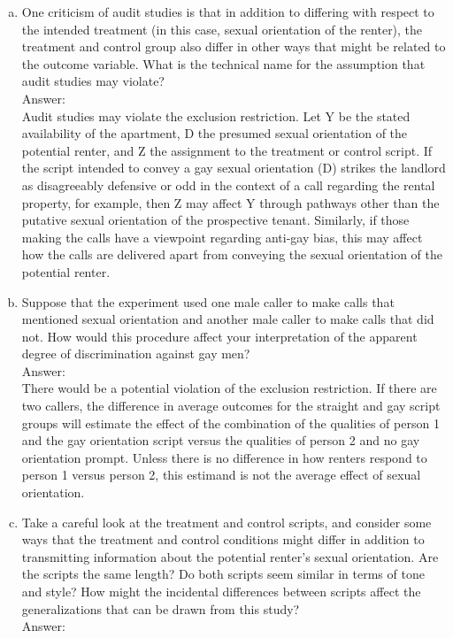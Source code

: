 \documentclass[11pt,notitlepage]{article}\usepackage[]{graphicx}\usepackage[]{color}
\begin{document}
\begin{enumerate}[a)]
\item One criticism of audit studies is that in addition to differing with respect to the intended treatment (in this case, sexual orientation of the renter), the treatment and control group also differ in other ways that might be related to the outcome variable. What is the technical name for the assumption that audit studies may violate?\\
Answer:\\
Audit studies may violate the exclusion restriction. Let Y be the stated availability of the apartment, D the presumed sexual orientation of the potential renter, and Z the assignment to the treatment or control script. If the script intended to convey a gay sexual orientation (D) strikes the landlord as disagreeably defensive or odd in the context of a call regarding the rental property, for example, then Z may affect Y through pathways other than the putative sexual orientation of the prospective tenant. Similarly, if those making the calls have a viewpoint regarding anti-gay bias, this may affect how the calls are delivered apart from conveying the sexual orientation of the potential renter.

\item Suppose that the experiment used one male caller to make calls that mentioned sexual orientation and another male caller to make calls that did not. How would this procedure affect your interpretation of the apparent degree of discrimination against gay men?\\
Answer:\\
There would be a potential violation of the exclusion restriction. If there are two callers, the difference in average outcomes for the straight and gay script groups will estimate the effect of the combination of the qualities of person 1 and the gay orientation script versus the qualities of person 2 and no gay orientation prompt. Unless there is no difference in how renters respond to person 1 versus person 2, this estimand is not the average effect of sexual orientation. 

\item Take a careful look at the treatment and control scripts, and consider some ways that the treatment and control conditions might differ in addition to transmitting information about the potential renter's sexual orientation. Are the scripts the same length? Do both scripts seem similar in terms of tone and style? How might the incidental differences between scripts affect the generalizations that can be drawn from this study?\\
Answer:\\


\end{enumerate}
\end{document}
